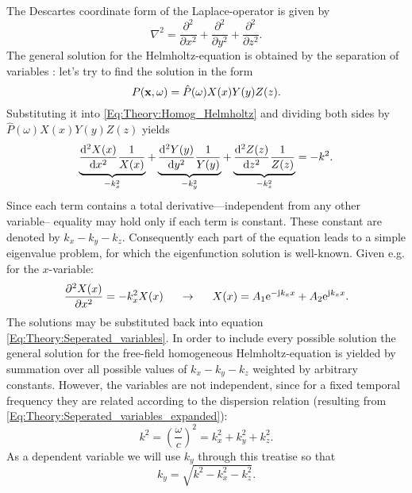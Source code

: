 The Descartes coordinate form of the Laplace-operator is given by
\begin{equation}
\nabla^2 = \frac{\partial^2}{\partial x^2} + \frac{\partial^2}{\partial y^2} +  \frac{\partial^2}{\partial z^2}.
\end{equation}
The general solution for the Helmholtz-equation is obtained by the separation of variables \cite{Devaney2012}: let's try to find the solution in the form
\begin{equation}
P(\mathbf{x},\omega) = \hat{P}(\omega) X(x)Y(y)Z(z).
\label{Eq:Theory:Seperated_variables}
\end{equation}
Substituting it into \eqref{Eq:Theory:Homog_Helmholtz} and dividing both sides by $\hat{P}(\omega) X(x)Y(y)Z(z)$ yields
\begin{equation}
\underbrace{\frac{\mathrm{d}^2 X(x)}{\mathrm{d} x^2}\frac{1}{X(x)}}_{-k_x^2} + 
\underbrace{\frac{\mathrm{d}^2 Y(y)}{\mathrm{d} y^2}\frac{1}{Y(y)}}_{-k_y^2} + 
\underbrace{\frac{\mathrm{d}^2 Z(z)}{\mathrm{d} z^2}\frac{1}{Z(z)}}_{-k_z^2}
= - k^2.
\label{Eq:Theory:Seperated_variables_expanded}
\end{equation}
Since each term contains a total derivative---independent from any other variable-- equality may hold only if each term is constant. These constant are denoted by $k_x-k_y-k_z$. Consequently each part of the equation leads to a simple eigenvalue problem, for which the eigenfunction solution is well-known. Given e.g. for the $x$-variable:
\begin{equation}
\frac{\partial^2 X(x)}{\partial x^2} = -k_x^2 X(x) \hspace{5mm} \rightarrow \hspace{5mm} X(x) = A_1 \mathrm{e}^{-\mathrm{j} k_x x} + A_2 \mathrm{e}^{\mathrm{j} k_x x}.
\end{equation}
The solutions may be substituted back into equation \eqref{Eq:Theory:Seperated_variables}. In order to include every possible solution the general solution for the free-field homogeneous Helmholtz-equation is yielded by summation over all possible values of $k_x-k_y-k_z$ weighted by arbitrary constants. However, the variables are not independent, since for a fixed temporal frequency they are related according to the dispersion relation
(resulting from \eqref{Eq:Theory:Seperated_variables_expanded}):
\begin{equation}
k^2 = \left( \frac{\omega}{c} \right)^2 = k_x^2 + k_y^2 + k_z^2.
\end{equation}
As a dependent variable we will use $k_y$ through this treatise so that
\begin{equation}
k_y = \sqrt{ k^2 - k_x^2 - k_z^2 }.
\end{equation}
